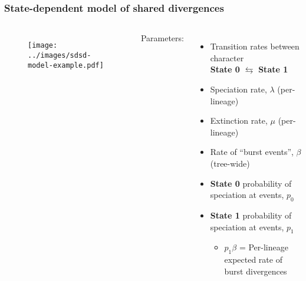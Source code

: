 {
\begin{frame}[t]
    \frametitle{State-dependent model of shared divergences}

    \vspace{-2mm}
    \begin{columns}[T]

        \begin{minipage}[t][\frametextheight][t]{\columnwidth}
            \begin{figure}
                \begin{center}
                    \texttt{[image: ../images/sdsd-model-example.pdf]}
                \end{center}
            \end{figure}
        \end{minipage}



        \begin{minipage}[t][\frametextheight][t]{\columnwidth}

            Parameters:

            \begin{itemize}
                \item Transition rates between character \\
                    \textbf{State 0} $\leftrightarrows$ \textbf{\textcolor{dbluestate}{State 1}}
                \item Speciation rate, $\lambda$ (per-lineage)
                \item Extinction rate, $\mu$ (per-lineage)
                \item Rate of ``burst events'', $\beta$ (tree-wide)
                \item \textbf{State 0} probability of speciation at events, $p_0$
                \item \textbf{\textcolor{dbluestate}{State 1}} probability of speciation at events, $p_1$
                \begin{itemize}
                    \item<2-> $p_1 \beta$ = Per-lineage expected rate of burst divergences
                \end{itemize}
            \end{itemize}


\end{minipage}
\end{columns}
\end{frame}}
